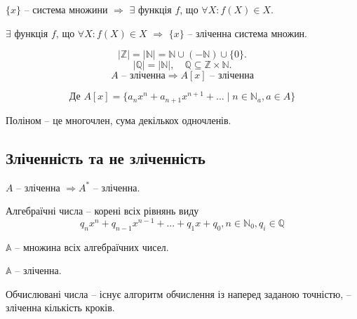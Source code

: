 \begin{claim}
    $\{ x \}$ -- система множини $\Rightarrow$ $\exists$
    функція $f$, що $\forall X: f(X) \in X$.
\end{claim}

\begin{claim}
    $\exists$ функція $f$, що $\forall X: f(X) \in X$ $\Rightarrow$ $\{ x \}$
    -- зліченна система множин.
\end{claim}

\begin{corollary}
    $$|\mathbb{Z}| = |\mathbb{N}| = \mathbb{N} \cup (-\mathbb{N}) \cup \{0\}.$$
    $$|\mathbb{Q}| = |\mathbb{N}|, \quad \mathbb{Q} \subseteq \mathbb{Z} \times \mathbb{N}.$$
    $$A \text{ -- зліченна} \Rightarrow A[x] \text{ -- зліченна}$$
    
    $$\text{Де } A[x] = \{ a_n x^n + a_{n+1} x^{n+1} + ... \mid n \in \mathbb{N}_a, a \in A \}$$
\end{corollary}

\begin{definition}[Поліном]
    Поліном -- це многочлен, сума декількох одночленів.
\end{definition}

\subsection{Зліченність та не зліченність}

\begin{claim}
    $A$ -- зліченна $\Rightarrow A^*$ -- зліченна.
\end{claim}

\begin{definition}
    Алгебраїчні числа -- корені всіх рівнянь виду
    $$q_nx^n + q_{n-1}x^{n-1} + ... + q_1x + q_0, n \in \mathbb{N}_0, q_i \in \mathbb{Q}$$
\end{definition}

\begin{definition}
    $\mathbb{A}$ -- множина всіх алгебраїчних чисел.
\end{definition}

$\mathbb{A}$ -- зліченна.

\begin{definition}
    Обчислювані числа -- існує алгоритм обчислення
    із наперед заданою точністю, -- зліченна кількість кроків.
\end{definition}


